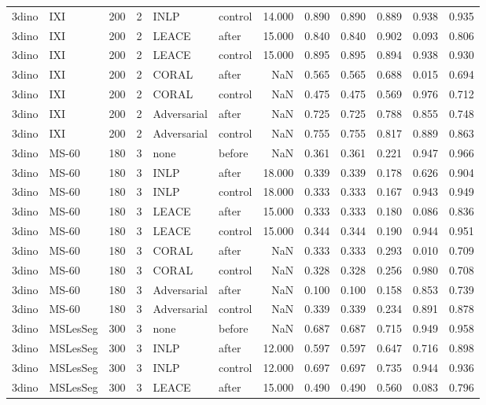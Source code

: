 \begin{tabular}{llrrllrrrrrr}
3dino & IXI & 200 & 2 & INLP & control & 14.000 & 0.890 & 0.890 & 0.889 & 0.938 & 0.935 \\
3dino & IXI & 200 & 2 & LEACE & after & 15.000 & 0.840 & 0.840 & 0.902 & 0.093 & 0.806 \\
3dino & IXI & 200 & 2 & LEACE & control & 15.000 & 0.895 & 0.895 & 0.894 & 0.938 & 0.930 \\
3dino & IXI & 200 & 2 & CORAL & after & NaN & 0.565 & 0.565 & 0.688 & 0.015 & 0.694 \\
3dino & IXI & 200 & 2 & CORAL & control & NaN & 0.475 & 0.475 & 0.569 & 0.976 & 0.712 \\
3dino & IXI & 200 & 2 & Adversarial & after & NaN & 0.725 & 0.725 & 0.788 & 0.855 & 0.748 \\
3dino & IXI & 200 & 2 & Adversarial & control & NaN & 0.755 & 0.755 & 0.817 & 0.889 & 0.863 \\
3dino & MS-60 & 180 & 3 & none & before & NaN & 0.361 & 0.361 & 0.221 & 0.947 & 0.966 \\
3dino & MS-60 & 180 & 3 & INLP & after & 18.000 & 0.339 & 0.339 & 0.178 & 0.626 & 0.904 \\
3dino & MS-60 & 180 & 3 & INLP & control & 18.000 & 0.333 & 0.333 & 0.167 & 0.943 & 0.949 \\
3dino & MS-60 & 180 & 3 & LEACE & after & 15.000 & 0.333 & 0.333 & 0.180 & 0.086 & 0.836 \\
3dino & MS-60 & 180 & 3 & LEACE & control & 15.000 & 0.344 & 0.344 & 0.190 & 0.944 & 0.951 \\
3dino & MS-60 & 180 & 3 & CORAL & after & NaN & 0.333 & 0.333 & 0.293 & 0.010 & 0.709 \\
3dino & MS-60 & 180 & 3 & CORAL & control & NaN & 0.328 & 0.328 & 0.256 & 0.980 & 0.708 \\
3dino & MS-60 & 180 & 3 & Adversarial & after & NaN & 0.100 & 0.100 & 0.158 & 0.853 & 0.739 \\
3dino & MS-60 & 180 & 3 & Adversarial & control & NaN & 0.339 & 0.339 & 0.234 & 0.891 & 0.878 \\
3dino & MSLesSeg & 300 & 3 & none & before & NaN & 0.687 & 0.687 & 0.715 & 0.949 & 0.958 \\
3dino & MSLesSeg & 300 & 3 & INLP & after & 12.000 & 0.597 & 0.597 & 0.647 & 0.716 & 0.898 \\
3dino & MSLesSeg & 300 & 3 & INLP & control & 12.000 & 0.697 & 0.697 & 0.735 & 0.944 & 0.936 \\
3dino & MSLesSeg & 300 & 3 & LEACE & after & 15.000 & 0.490 & 0.490 & 0.560 & 0.083 & 0.796 \\

\end{tabular}
